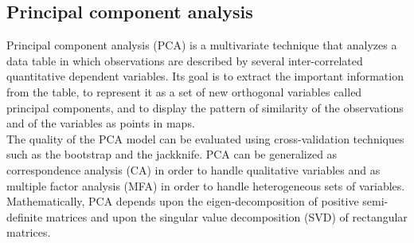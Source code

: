 \subsection{Principal component analysis}\label{pca}
Principal component analysis (PCA) is a multivariate technique that analyzes a data table in which observations are described by several inter-correlated quantitative dependent variables. Its goal is to extract the important information from the table, to represent it as a set of new orthogonal variables called principal components, and to display the pattern of similarity of the observations and of the variables as points in maps. \\
The quality of the PCA model can be evaluated using cross-validation techniques such as the bootstrap and the jackknife. PCA can be generalized as correspondence analysis (CA) in order to handle qualitative variables and as multiple factor analysis (MFA) in order to handle heterogeneous sets of variables. Mathematically, PCA depends upon the eigen-decomposition of positive semi-definite matrices and upon the singular value decomposition (SVD) of rectangular matrices.\cite{pca}
